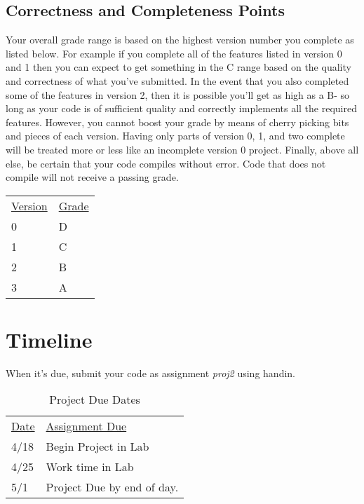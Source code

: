 \documentclass[]{tufte-handout}
\begin{document}
\subsection{Correctness and Completeness Points}

Your overall grade range is based on the highest version number you complete as listed below. For example
if you complete all of the features listed in version 0 and 1 then you can expect
to get something in the C range based on the quality and correctness of what you've
submitted. In the event that you also completed some of the features in version 2, then
it is possible you'll get as high as a B- so long as your code is of sufficient quality and
correctly implements all the required features.  However, you cannot boost your grade by
means of cherry picking bits and pieces of each version.  Having only parts of version
0, 1, and two complete will be treated more or less like an incomplete version 0 project.
Finally, above all else, be certain that your code compiles without error. Code that
does not compile will not receive a passing grade.


\begin{tabular}{@{}ll@{}}
\underline{Version} & \underline{Grade} \\
0 & D\\
1 & C\\
2 & B\\
3 & A\\
\end{tabular}


\newpage

\section{Timeline}

When it's due, submit your code as assignment \textit{proj2} using handin.
\begin{table}[!htpb]
  \begin{tabular}{ll}
    \underline{Date} & \underline{Assignment Due} \\
      4/18 & Begin Project in Lab \\
      4/25 & Work time in Lab \\
      5/1 & Project Due by end of day.
  \end{tabular}
  \caption{Project Due Dates}\label{tab:duedates}
\end{table}
\end{document}
